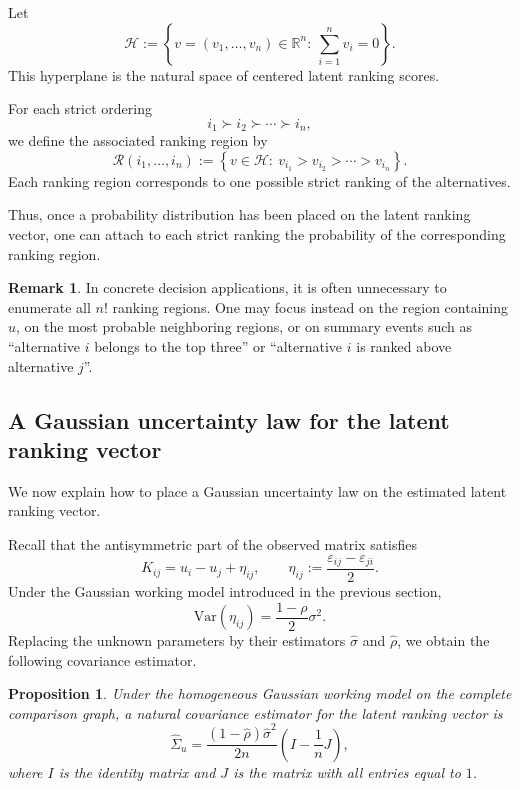 \documentclass[11pt]{amsart}
\theoremstyle{definition}
\newtheorem{remark}[definition]{Remark}
\theoremstyle{plain}
\newtheorem{proposition}[definition]{Proposition}
\numberwithin{equation}{section}
\begin{document}
Let
\[
\mathcal H:=\left\{v=(v_1,\dots,v_n)\in\mathbb R^n:\ \sum_{i=1}^n v_i=0\right\}.
\]
This hyperplane is the natural space of centered latent ranking scores.

For each strict ordering
\[
i_1 \succ i_2 \succ \cdots \succ i_n,
\]
we define the associated ranking region by
\begin{equation}\label{eq:rankingregioncorr}
\mathcal R(i_1,\dots,i_n)
:=
\left\{v\in\mathcal H:\ v_{i_1}>v_{i_2}>\cdots>v_{i_n}\right\}.
\end{equation}
Each ranking region corresponds to one possible strict ranking of the alternatives.

Thus, once a probability distribution has been placed on the latent ranking vector, one can attach to each strict ranking the probability of the corresponding ranking region.

\begin{remark}
In concrete decision applications, it is often unnecessary to enumerate all $n!$ ranking regions. One may focus instead on the region containing $\widehat u$, on the most probable neighboring regions, or on summary events such as ``alternative $i$ belongs to the top three'' or ``alternative $i$ is ranked above alternative $j$''.
\end{remark}

\subsection{A Gaussian uncertainty law for the latent ranking vector}

We now explain how to place a Gaussian uncertainty law on the estimated latent ranking vector.

Recall that the antisymmetric part of the observed matrix satisfies
\[
K_{ij}=u_i-u_j+\eta_{ij},
\qquad
\eta_{ij}:=\frac{\varepsilon_{ij}-\varepsilon_{ji}}{2}.
\]
Under the Gaussian working model introduced in the previous section,
\[
\mathrm{Var}(\eta_{ij})=\frac{1-\rho}{2}\sigma^2.
\]
Replacing the unknown parameters by their estimators $\widehat\sigma$ and $\widehat\rho$, we obtain the following covariance estimator.

\begin{proposition}
Under the homogeneous Gaussian working model on the complete comparison graph, a natural covariance estimator for the latent ranking vector is
\begin{equation}\label{eq:Sigmahatcorr}
\widehat\Sigma_u
=
\frac{(1-\widehat\rho)\widehat\sigma^2}{2n}
\left(I-\frac1nJ\right),
\end{equation}
where $I$ is the identity matrix and $J$ is the matrix with all entries equal to $1$.
\end{proposition}
\end{document}
